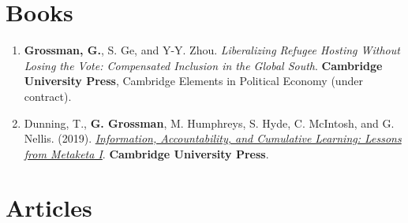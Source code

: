 \documentclass[10pt,a4paper]{article}
\begin{document}
\section{Books}

\begin{enumerate}[leftmargin=2em, itemsep=6pt, topsep=4pt]
\item \textbf{Grossman, G.}, S. Ge, and Y-Y. Zhou. \textit{Liberalizing Refugee Hosting Without Losing the Vote: Compensated Inclusion in the Global South}. \textbf{Cambridge University Press}, Cambridge Elements in Political Economy (under contract).

\item Dunning, T., \textbf{G. Grossman}, M. Humphreys, S. Hyde, C. McIntosh, and G. Nellis. (2019). \href{https://bit.ly/2FcrhKE}{\textit{Information, Accountability, and Cumulative Learning: Lessons from Metaketa I}}. \textbf{Cambridge University Press}.
\end{enumerate}

\newpage
\section{Articles}
\end{document}
